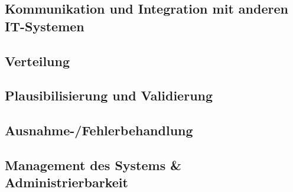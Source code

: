 \subsection{Kommunikation und Integration mit anderen IT-Systemen}

\subsection{Verteilung}

\subsection{Plausibilisierung und Validierung}

\subsection{Ausnahme-/Fehlerbehandlung}

\subsection{Management des Systems \& Administrierbarkeit}

